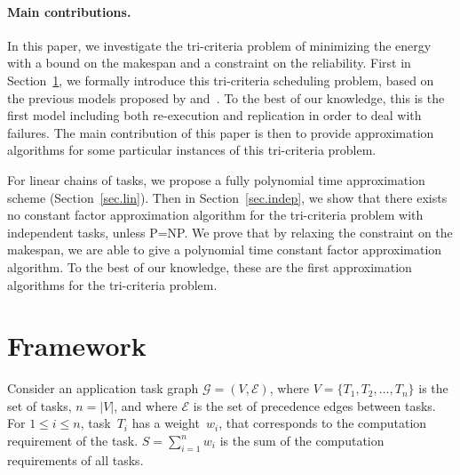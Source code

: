\documentclass[a4paper]{article}
\theoremstyle{plain}
\theoremstyle{definition}
\theoremstyle{remark}
\newcommand\EE{\ensuremath{\mathcal{E}}\xspace}
\begin{document}
\paragraph{Main contributions.}  
In this paper, we investigate the tri-criteria problem of minimizing
the energy with a bound on the makespan and a constraint on the
reliability.  First in Section~\ref{sec.fw}, we formally introduce
this tri-criteria scheduling problem, based on the previous models
proposed by \cite{Zhu06} and~\cite{rr7757}.  To the best of our
knowledge, this is the first model including both re-execution and
replication in order to deal with failures. The main contribution of
this paper is then to provide approximation algorithms for some
particular instances of this tri-criteria problem.

For linear chains of tasks, we propose a fully polynomial time
approximation scheme (Section~\ref{sec.lin}). Then in
Section~\ref{sec.indep}, we show that there exists no constant factor
approximation algorithm for the tri-criteria problem with independent
tasks, unless P=NP. We prove that by relaxing the constraint on
the makespan, we are able to give a polynomial time constant factor
approximation algorithm.  To the best of our knowledge, these are the
first approximation algorithms for the tri-criteria problem. 


\section{Framework}
    \label{sec.fw}
Consider an application task graph $\mathcal{G}=(V,\mathcal{E})$,
where $V= \{T_1, T_2, \dots, T_n\}$ is the set of tasks, $n = |V|$,
and where $\EE$ is the set of precedence edges between tasks. For $1
\leq i \leq n$, task~$T_i$ has a weight~$w_i$, that corresponds to the
computation requirement of the task.  $S=\sum_{i=1}^n w_i$ is the
sum of the computation requirements of all tasks.
\end{document}
